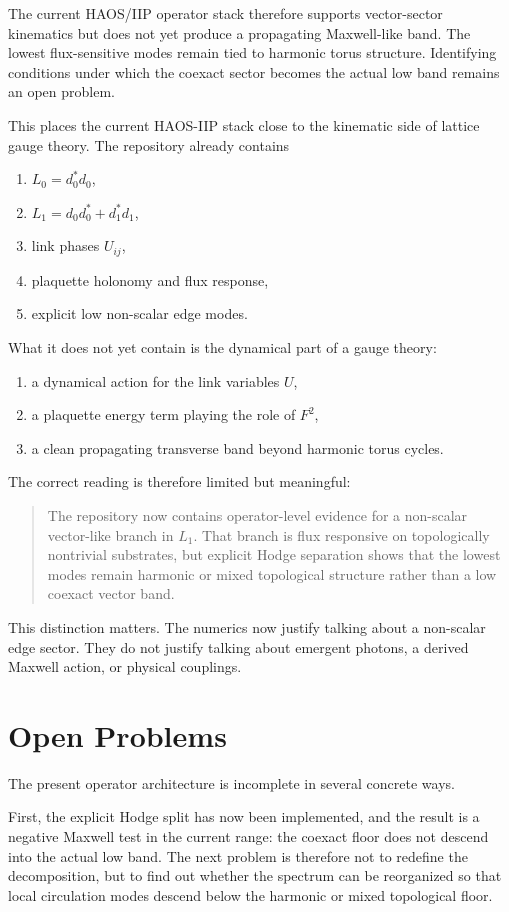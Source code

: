 \documentclass[11pt]{article}
\begin{document}
The current HAOS/IIP operator stack therefore supports vector-sector kinematics but does not yet produce a propagating Maxwell-like band. The lowest flux-sensitive modes remain tied to harmonic torus structure. Identifying conditions under which the coexact sector becomes the actual low band remains an open problem.

This places the current HAOS-IIP stack close to the kinematic side of lattice gauge theory. The repository already contains
\begin{enumerate}
\item $L_0 = d_0^* d_0$,
\item $L_1 = d_0 d_0^* + d_1^* d_1$,
\item link phases $U_{ij}$,
\item plaquette holonomy and flux response,
\item explicit low non-scalar edge modes.
\end{enumerate}
What it does not yet contain is the dynamical part of a gauge theory:
\begin{enumerate}
\item a dynamical action for the link variables $U$,
\item a plaquette energy term playing the role of $F^2$,
\item a clean propagating transverse band beyond harmonic torus cycles.
\end{enumerate}

The correct reading is therefore limited but meaningful:
\begin{quote}
The repository now contains operator-level evidence for a non-scalar vector-like branch in $L_1$. That branch is flux responsive on topologically nontrivial substrates, but explicit Hodge separation shows that the lowest modes remain harmonic or mixed topological structure rather than a low coexact vector band.
\end{quote}
This distinction matters. The numerics now justify talking about a non-scalar edge sector. They do not justify talking about emergent photons, a derived Maxwell action, or physical couplings.

\section{Open Problems}
The present operator architecture is incomplete in several concrete ways.

First, the explicit Hodge split has now been implemented, and the result is a negative Maxwell test in the current range: the coexact floor does not descend into the actual low band. The next problem is therefore not to redefine the decomposition, but to find out whether the spectrum can be reorganized so that local circulation modes descend below the harmonic or mixed topological floor.
\end{document}

